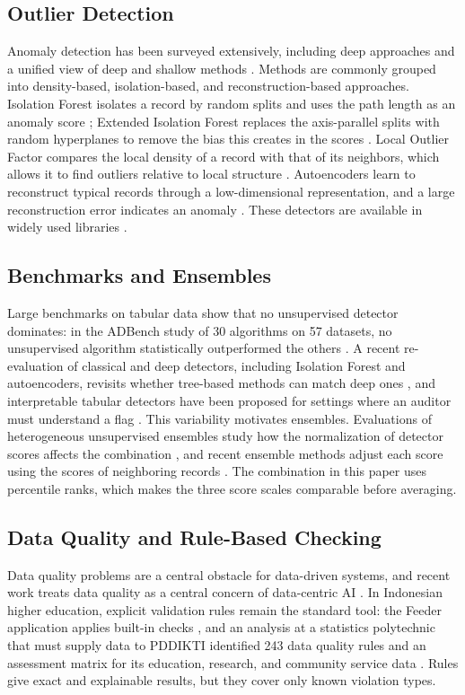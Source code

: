 \documentclass[conference]{IEEEtran}
\begin{document}
\subsection{Outlier Detection}
Anomaly detection has been surveyed extensively, including deep approaches \cite{pang2021deep} and a unified view of deep and shallow methods \cite{ruff2021unifying}. Methods are commonly grouped into density-based, isolation-based, and reconstruction-based approaches. Isolation Forest isolates a record by random splits and uses the path length as an anomaly score \cite{liu2008iforest}; Extended Isolation Forest replaces the axis-parallel splits with random hyperplanes to remove the bias this creates in the scores \cite{hariri2021eif}. Local Outlier Factor compares the local density of a record with that of its neighbors, which allows it to find outliers relative to local structure \cite{breunig2000lof}. Autoencoders learn to reconstruct typical records through a low-dimensional representation, and a large reconstruction error indicates an anomaly \cite{pang2021deep,ruff2021unifying}. These detectors are available in widely used libraries \cite{scikit-learn,chen2024pyod2}.

\subsection{Benchmarks and Ensembles}
Large benchmarks on tabular data show that no unsupervised detector dominates: in the ADBench study of 30 algorithms on 57 datasets, no unsupervised algorithm statistically outperformed the others \cite{han2022adbench}. A recent re-evaluation of classical and deep detectors, including Isolation Forest and autoencoders, revisits whether tree-based methods can match deep ones \cite{mehta2024benchmark}, and interpretable tabular detectors have been proposed for settings where an auditor must understand a flag \cite{chang2023diad}. This variability motivates ensembles. Evaluations of heterogeneous unsupervised ensembles study how the normalization of detector scores affects the combination \cite{kluttermann2023ensembles}, and recent ensemble methods adjust each score using the scores of neighboring records \cite{yang2024regional}. The combination in this paper uses percentile ranks, which makes the three score scales comparable before averaging.

\subsection{Data Quality and Rule-Based Checking}
Data quality problems are a central obstacle for data-driven systems, and recent work treats data quality as a central concern of data-centric AI \cite{whang2023dataquality,zha2025dcai}. In Indonesian higher education, explicit validation rules remain the standard tool: the Feeder application applies built-in checks \cite{feeder_guide}, and an analysis at a statistics polytechnic that must supply data to PDDIKTI identified 243 data quality rules and an assessment matrix for its education, research, and community service data \cite{sumadi2021dq}. Rules give exact and explainable results, but they cover only known violation types.
\end{document}
